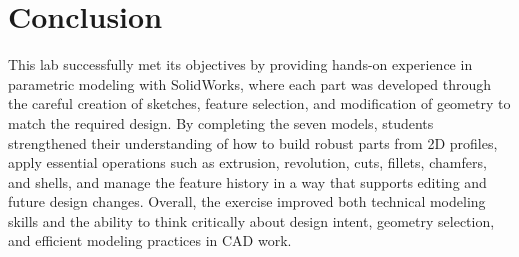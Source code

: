 \section{Conclusion}

This lab successfully met its objectives by providing hands-on experience in parametric modeling with SolidWorks, where each part was developed through the careful creation of sketches, feature selection, and modification of geometry to match the required design. By completing the seven models, students strengthened their understanding of how to build robust parts from 2D profiles, apply essential operations such as extrusion, revolution, cuts, fillets, chamfers, and shells, and manage the feature history in a way that supports editing and future design changes. Overall, the exercise improved both technical modeling skills and the ability to think critically about design intent, geometry selection, and efficient modeling practices in CAD work.
